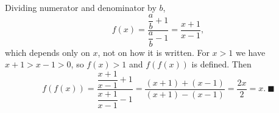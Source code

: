 Dividing numerator and denominator by $b$,
\[f(x)=\dfrac{\dfrac ab+1}{\dfrac ab-1}=\dfrac{x+1}{x-1},\]
which depends only on $x$, not on how it is written. For $x>1$ we have $x+1>x-1>0$, so $f(x)>1$ and $f(f(x))$ is defined. Then
\[f(f(x))=\dfrac{\dfrac{x+1}{x-1}+1}{\dfrac{x+1}{x-1}-1}=\dfrac{(x+1)+(x-1)}{(x+1)-(x-1)}=\dfrac{2x}{2}=x.\ \blacksquare\]
